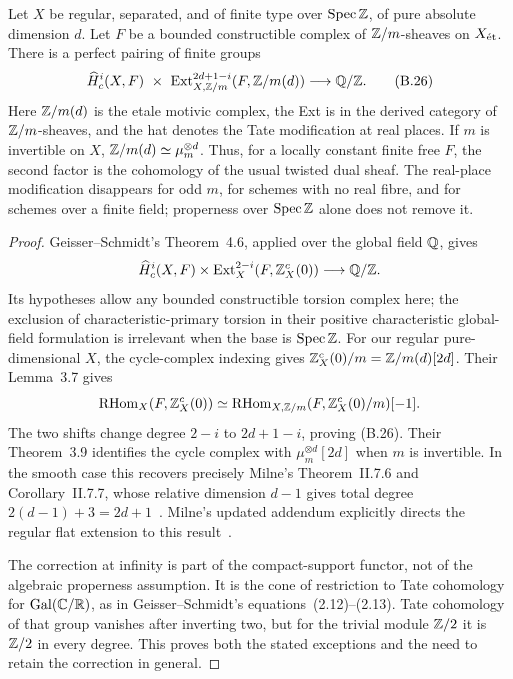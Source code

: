 \begin{theorem}
\label{thm:B-finite-duality}
Let \(X\) be regular, separated, and of finite type over \(\operatorname{Spec}\mathbb Z\),
of pure absolute dimension \(d\).  Let \(F\) be a bounded
constructible complex of \(\mathbb Z/m\)-sheaves on \(X_{\mathrm{\acute et}}\).
There is a perfect pairing of finite groups
\[
 \widehat H_c^i(X,F)\ \times\
\operatorname{Ext}^{2d+1-i}_{X,\mathbb Z/m}
       (F,\mathbb Z/m(d))\longrightarrow\mathbb Q/\mathbb Z.\tag{B.26}
\]
Here \(\mathbb Z/m(d)\) is the etale motivic complex, the Ext is in the
derived category of \(\mathbb Z/m\)-sheaves, and the hat denotes the
Tate modification at real places.  If \(m\) is invertible on \(X\),
\(\mathbb Z/m(d)\simeq\mu_m^{\otimes d}\).  Thus, for a locally
constant finite free \(F\), the second factor is the cohomology of
the usual twisted dual sheaf.  The real-place modification disappears
for odd \(m\), for schemes with no real fibre, and for schemes over
a finite field; properness over \(\operatorname{Spec}\mathbb Z\) alone does not remove it.
\end{theorem}
\begin{proof}
Geisser--Schmidt's Theorem~4.6, applied over the global field \(\mathbb Q\),
gives
\[
\widehat H_c^i(X,F)\times
\operatorname{Ext}^{2-i}_{X}(F,\mathbb Z_X^c(0))\longrightarrow\mathbb Q/\mathbb Z.
\]
Its hypotheses allow any bounded constructible torsion complex here;
the exclusion of characteristic-primary torsion in their positive
characteristic global-field formulation is irrelevant when the base
is \(\operatorname{Spec}\mathbb Z\).  For our regular pure-dimensional \(X\), the
cycle-complex indexing gives
\(\mathbb Z_X^c(0)/m=\mathbb Z/m(d)[2d]\).
Their Lemma~3.7 gives
\[
\operatorname{RHom}_X(F,\mathbb Z_X^c(0))\simeq
\operatorname{RHom}_{X,\mathbb Z/m}(F,\mathbb Z_X^c(0)/m)[-1].
\]
The two shifts change degree \(2-i\) to \(2d+1-i\), proving
(B.26).  Their Theorem~3.9 identifies the cycle complex with
\(\mu_m^{\otimes d}[2d]\) when \(m\) is invertible.  In the
smooth case this recovers precisely Milne's Theorem~II.7.6 and
Corollary~II.7.7, whose relative dimension \(d-1\) gives total
degree \(2(d-1)+3=2d+1\)~\cite{BGeisserSchmidt2018,AMilneADT}.
Milne's updated addendum explicitly directs the regular flat extension
to this result~\cite{BMilneErrata2025}.

The correction at infinity is part of the compact-support functor,
not of the algebraic properness assumption.  It is the cone of
restriction to Tate cohomology for \(\operatorname{Gal}(\mathbb C/\mathbb R)\), as in
Geisser--Schmidt's equations~(2.12)--(2.13).  Tate cohomology of that
group vanishes after inverting two, but for the trivial module
\(\mathbb Z/2\) it is \(\mathbb Z/2\) in every degree.  This proves both
the stated exceptions and the need to retain the correction in general.
\end{proof}

